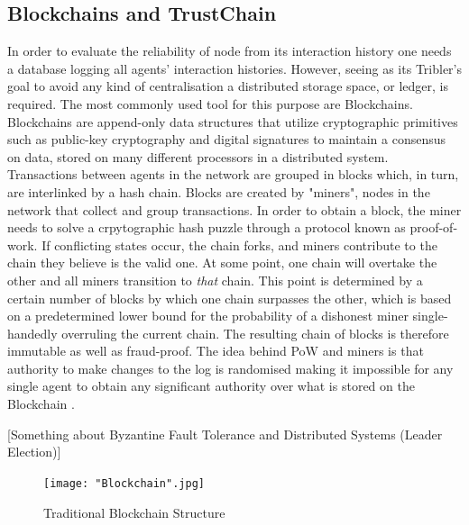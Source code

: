\documentclass[11pt,a4paper]{report}
\theoremstyle{definition}
\theoremstyle{theorem}
\theoremstyle{proposition}
\theoremstyle{corollary}
\theoremstyle{lemma}
\theoremstyle{example}
\theoremstyle{remark}
\begin{document}
\subsection{Blockchains and TrustChain}
\label{subsec:Blockchains and TrustChain}
\noindent{}In order to evaluate the reliability of node from its interaction history one needs a database logging all agents' interaction histories. However, seeing as its Tribler's goal to avoid any kind of centralisation a distributed storage space, or ledger, is required. The most commonly used tool for this purpose are Blockchains. Blockchains are append-only data structures that utilize cryptographic primitives such as public-key cryptography and digital signatures to maintain a consensus on data, stored on many different processors in a distributed system. Transactions between agents in the network are grouped in blocks which, in turn, are interlinked by a hash chain. Blocks are created by "miners", nodes in the network that collect and group transactions. In order to obtain a block, the miner needs to solve a crpytographic hash puzzle through a protocol known as proof-of-work. If conflicting states occur, the chain forks, and miners contribute to the chain they believe is the valid one. At some point, one chain will overtake the other and all miners transition to {\it that} chain. This point is determined by a certain number of blocks by which one chain surpasses the other, which is based on a predetermined lower bound for the probability of a dishonest miner single-handedly overruling the current chain. The resulting chain of blocks is therefore immutable as well as fraud-proof. The idea behind PoW and miners is that authority to make changes to the log is randomised making it impossible for any single agent to obtain any significant authority over what is stored on the Blockchain \cite{Bitcoin: A peer-to-peer electronic cash system}. \vspace{1em}\\

\begin{center}[Something about Byzantine Fault Tolerance and Distributed Systems (Leader Election)]\vspace{1em}\\\end{center}

\begin{figure}[H]
\begin{center}
\texttt{[image: "Blockchain".jpg]}
\caption{Traditional Blockchain Structure}
\label{fig:Blockchain}
\end{center}
\end{figure}
\end{document}
